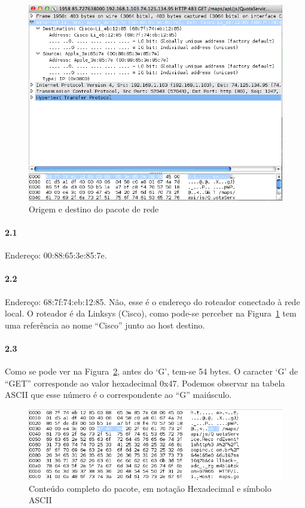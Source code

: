 \documentclass[12pt,a4paper]{report}
\begin{document}
\begin{figure}[h]
\centering
\includegraphics[width=\textwidth]{Ethernet-source-destination.png}
\caption{Origem e destino do pacote de rede}
\label{fig:ethernetsd}
\end{figure}

\paragraph{2.1} Endereço: 00:88:65:3e:85:7e.

\paragraph{2.2} Endereço: 68:7f:74:eb:12:85. Não, esse é o endereço do roteador conectado à rede local. O roteador é da Linksys (Cisco), como pode-se perceber na Figura~\ref{fig:ethernetsd} tem uma referência ao nome ``Cisco'' junto ao host destino.

\paragraph{2.3} Como se pode ver na Figura~\ref{fig:get}, antes do `G', tem-se 54 bytes. O caracter `G' de ``GET'' corresponde ao valor hexadecimal 0x47. Podemos observar na tabela ASCII que esse número é o correspondente ao ``G'' maiúsculo.

\begin{figure}[h]
\centering
\includegraphics[width=\textwidth]{GET.png}
\caption{Conteúdo completo do pacote, em notação Hexadecimal e símbolo ASCII}
\label{fig:get}
\end{figure}
\end{document}
